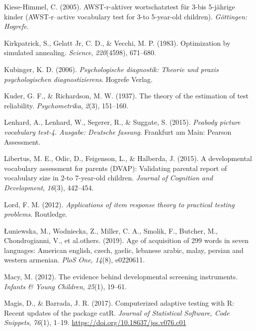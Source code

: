 \documentclass[
  man,floatsintext]{apa6}
\newlength{\cslhangindent}
\newlength{\cslentryspacingunit} %
\newenvironment{CSLReferences}[2] %
 {%
  \setlength{\parindent}{0pt}
  \ifodd #1
  \let\oldpar\par
  \def\par{\hangindent=\cslhangindent\oldpar}
  \fi
  \setlength{\parskip}{#2\cslentryspacingunit}
 }%
 {}
\begin{document}
\begin{CSLReferences}{1}{0}
\leavevmode{}%
Kiese-Himmel, C. (2005). AWST-r-aktiver wortschatztest f{ü}r 3-bis 5-j{ä}hrige kinder (AWST-r--active vocabulary test for 3-to 5-year-old children). \emph{G{ö}ttingen: Hogrefe}.

\leavevmode{}%
Kirkpatrick, S., Gelatt Jr, C. D., \& Vecchi, M. P. (1983). Optimization by simulated annealing. \emph{Science}, \emph{220}(4598), 671--680.

\leavevmode{}%
Kubinger, K. D. (2006). \emph{Psychologische diagnostik: Theorie und praxis psychologischen diagnostizierens}. Hogrefe Verlag.

\leavevmode{}%
Kuder, G. F., \& Richardson, M. W. (1937). The theory of the estimation of test reliability. \emph{Psychometrika}, \emph{2}(3), 151--160.

\leavevmode{}%
Lenhard, A., Lenhard, W., Segerer, R., \& Suggate, S. (2015). \emph{Peabody picture vocabulary test-4. Ausgabe: Deutsche fassung}. Frankfurt am Main: Pearson Assessment.

\leavevmode{}%
Libertus, M. E., Odic, D., Feigenson, L., \& Halberda, J. (2015). A developmental vocabulary assessment for parents (DVAP): Validating parental report of vocabulary size in 2-to 7-year-old children. \emph{Journal of Cognition and Development}, \emph{16}(3), 442--454.

\leavevmode{}%
Lord, F. M. (2012). \emph{Applications of item response theory to practical testing problems}. Routledge.

\leavevmode{}%
Łuniewska, M., Wodniecka, Z., Miller, C. A., Smolik, F., Butcher, M., Chondrogianni, V., et al.others. (2019). Age of acquisition of 299 words in seven languages: American english, czech, gaelic, lebanese arabic, malay, persian and western armenian. \emph{PloS One}, \emph{14}(8), e0220611.

\leavevmode{}%
Macy, M. (2012). The evidence behind developmental screening instruments. \emph{Infants \& Young Children}, \emph{25}(1), 19--61.

\leavevmode{}%
Magis, D., \& Barrada, J. R. (2017). Computerized adaptive testing with {R}: Recent updates of the package {catR}. \emph{Journal of Statistical Software, Code Snippets}, \emph{76}(1), 1--19. \url{https://doi.org/10.18637/jss.v076.c01}


\end{CSLReferences}
\end{document}
